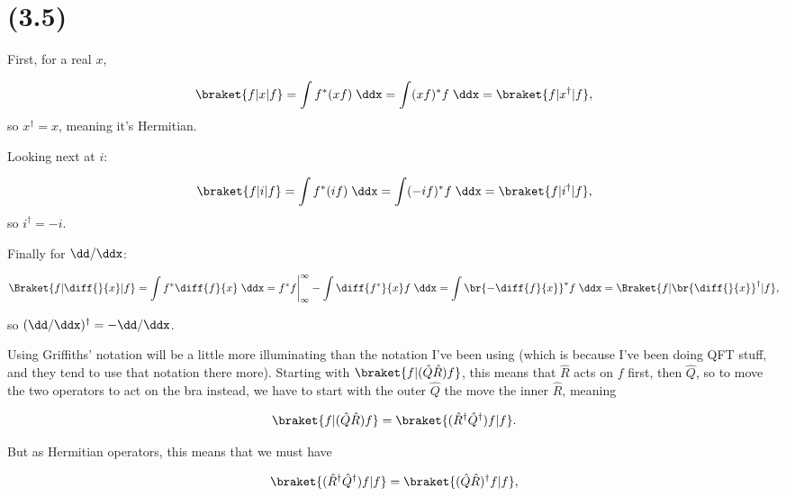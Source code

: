 \section{(3.5)}

\begin{parts}

\item First, for a real $x$,


\begin{equation}
    \braket{f|x|f} = \int f^* (xf) \;\ddx = \int(xf)^* f \;\ddx = \braket{f|x^{\dagger}|f},
\end{equation}
so $x^{\dagger} = x$, meaning it's Hermitian.

Looking next at $i$:

\begin{equation}
    \braket{f|i|f} = \int f^* (if) \;\ddx = \int (-if)^* f \;\ddx = \braket{f|i^{\dagger}|f},
\end{equation}
so $i^{\dagger} = -i$.

Finally for $\dd/\ddx$:

\begin{equation}
    \Braket{f|\diff{}{x}|f} = \int f^* \diff{f}{x} \;\ddx = f^*f\bigg|_{\infty}^{\infty} - \int \diff{f^*}{x} f \;\ddx = \int \br{-\diff{f}{x}}^* f\;\ddx = \Braket{f|\br{\diff{}{x}}^{\dagger}|f},
\end{equation}

so $(\dd/\ddx)^{\dagger} = -\dd/\ddx$.




\item Using Griffiths' notation will be a little more illuminating than the notation I've been using (which is because I've been doing QFT stuff, and they tend to use that notation there more). Starting with $\braket{f|(\hat{Q}\hat{R})f}$, this means that $\hat{R}$ acts on $f$ first, then $\hat{Q}$, so to move the two operators to act on the bra instead, we have to start with the outer $\hat{Q}$ the move the inner $\hat{R}$, meaning

\begin{equation}
    \braket{f|(\hat{Q}\hat{R})f} = \braket{(\hat{R}^{\dagger}\hat{Q}^{\dagger})f|f}.
\end{equation}

But as Hermitian operators, this means that we must have

\begin{equation}
    \braket{(\hat{R}^{\dagger}\hat{Q}^{\dagger})f|f} = \braket{(\hat{Q}\hat{R})^{\dagger}f|f},
\end{equation}


\end{parts}
